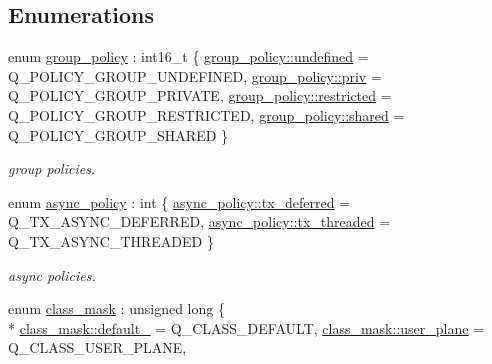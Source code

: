 \subsection*{Enumerations}
\begin{DoxyCompactItemize}
\item 
enum \hyperlink{namespacepfq_ac41249c8510558905b01fa4d866a38d7}{group\+\_\+policy} \+: int16\+\_\+t \{ \hyperlink{namespacepfq_ac41249c8510558905b01fa4d866a38d7a5e543256c480ac577d30f76f9120eb74}{group\+\_\+policy\+::undefined} = Q\+\_\+\+P\+O\+L\+I\+C\+Y\+\_\+\+G\+R\+O\+U\+P\+\_\+\+U\+N\+D\+E\+F\+I\+N\+E\+D, 
\hyperlink{namespacepfq_ac41249c8510558905b01fa4d866a38d7a908b453051b556e053731714a5193921}{group\+\_\+policy\+::priv} = Q\+\_\+\+P\+O\+L\+I\+C\+Y\+\_\+\+G\+R\+O\+U\+P\+\_\+\+P\+R\+I\+V\+A\+T\+E, 
\hyperlink{namespacepfq_ac41249c8510558905b01fa4d866a38d7ac89b33f8b3f6f452ef6f07d397b5dcdf}{group\+\_\+policy\+::restricted} = Q\+\_\+\+P\+O\+L\+I\+C\+Y\+\_\+\+G\+R\+O\+U\+P\+\_\+\+R\+E\+S\+T\+R\+I\+C\+T\+E\+D, 
\hyperlink{namespacepfq_ac41249c8510558905b01fa4d866a38d7a9e81e7b963c71363e2fb3eefcfecfc0e}{group\+\_\+policy\+::shared} = Q\+\_\+\+P\+O\+L\+I\+C\+Y\+\_\+\+G\+R\+O\+U\+P\+\_\+\+S\+H\+A\+R\+E\+D
 \}
\begin{DoxyCompactList}\small\item\em group policies. \end{DoxyCompactList}\item 
enum \hyperlink{namespacepfq_a1746801a74eba08ffdc09e63ceef61b4}{async\+\_\+policy} \+: int \{ \hyperlink{namespacepfq_a1746801a74eba08ffdc09e63ceef61b4aaac4195216fbbb11f455deff79f13e57}{async\+\_\+policy\+::tx\+\_\+deferred} = Q\+\_\+\+T\+X\+\_\+\+A\+S\+Y\+N\+C\+\_\+\+D\+E\+F\+E\+R\+R\+E\+D, 
\hyperlink{namespacepfq_a1746801a74eba08ffdc09e63ceef61b4a4bb5789fc0dc625ba948410d59ead775}{async\+\_\+policy\+::tx\+\_\+threaded} = Q\+\_\+\+T\+X\+\_\+\+A\+S\+Y\+N\+C\+\_\+\+T\+H\+R\+E\+A\+D\+E\+D
 \}
\begin{DoxyCompactList}\small\item\em async policies. \end{DoxyCompactList}\item 
enum \hyperlink{namespacepfq_a96af1f5ed530eff563eb917516758fbb}{class\+\_\+mask} \+: unsigned long \{ \\*
\hyperlink{namespacepfq_a96af1f5ed530eff563eb917516758fbba172b03053216c6158fe380805998ad6c}{class\+\_\+mask\+::default\+\_\+} = Q\+\_\+\+C\+L\+A\+S\+S\+\_\+\+D\+E\+F\+A\+U\+L\+T, 
\hyperlink{namespacepfq_a96af1f5ed530eff563eb917516758fbba539d70f37267eda88597177e215a6d2a}{class\+\_\+mask\+::user\+\_\+plane} = Q\+\_\+\+C\+L\+A\+S\+S\+\_\+\+U\+S\+E\+R\+\_\+\+P\+L\+A\+N\+E, 

\end{DoxyCompactItemize}
